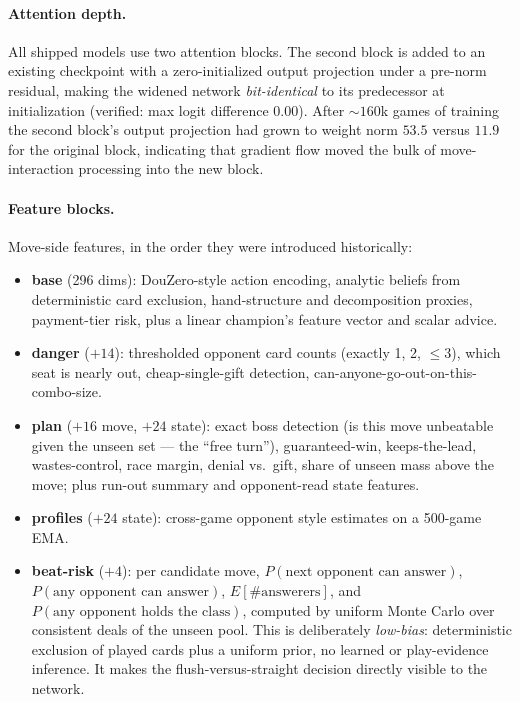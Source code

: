 \documentclass[11pt]{article}
\begin{document}
\paragraph{Attention depth.} All shipped models use two attention
blocks. The second block is added to an existing checkpoint with a
zero-initialized output projection under a pre-norm residual, making
the widened network \emph{bit-identical} to its predecessor at
initialization (verified: max logit difference $0.00$). After
$\sim 160$k games of training the second block's output projection had
grown to weight norm $53.5$ versus $11.9$ for the original block,
indicating that gradient flow moved the bulk of move-interaction
processing into the new block.

\paragraph{Feature blocks.} Move-side features, in the order they were
introduced historically:
\begin{itemize}
\item \textbf{base} (296 dims): DouZero-style action encoding, analytic
  beliefs from deterministic card exclusion, hand-structure and
  decomposition proxies, payment-tier risk, plus a linear champion's
  feature vector and scalar advice.
\item \textbf{danger} ($+14$): thresholded opponent card counts
  (exactly 1, 2, $\leq 3$), which seat is nearly out, cheap-single-gift
  detection, can-anyone-go-out-on-this-combo-size.
\item \textbf{plan} ($+16$ move, $+24$ state): exact boss detection (is
  this move unbeatable given the unseen set --- the ``free turn''),
  guaranteed-win, keeps-the-lead, wastes-control, race margin, denial
  vs.\ gift, share of unseen mass above the move; plus run-out summary
  and opponent-read state features.
\item \textbf{profiles} ($+24$ state): cross-game opponent style
  estimates on a 500-game EMA.
\item \textbf{beat-risk} ($+4$): per candidate move, $P(\text{next
  opponent can answer})$, $P(\text{any opponent can answer})$,
  $E[\#\text{answerers}]$, and $P(\text{any opponent holds the
  class})$, computed by uniform Monte Carlo over consistent deals of
  the unseen pool. This is deliberately \emph{low-bias}: deterministic
  exclusion of played cards plus a uniform prior, no learned or
  play-evidence inference. It makes the flush-versus-straight decision
  directly visible to the network.
\end{itemize}
\end{document}
